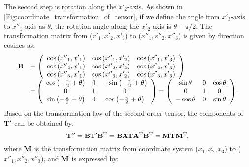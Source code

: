The second step is rotation along the $x'_2$-axis. As shown in \ref{Fig:coordinate_transformation_of_tensor}, if we define the angle from $x'_3$-axis to $x''_1$-axis as $\theta$, the rotation angle along the $x'_2$-axis is $\theta-{\pi}/{2}$. The transformation matrix from ($x'_1,x'_2,x'_3$) to ($x''_1,x''_2,x''_3$) is given by direction cosines as:
\begin{eqnarray}
\begin{array}{*{20}{l}}
{\bf{B}}&{ = \left( {\begin{array}{*{20}{c}}
{\cos \left( {{{x''}_1},{{x'}_1}} \right)}&{\cos \left( {{{x''}_1},{{x'}_2}} \right)}&{\cos \left( {{{x''}_1},{{x'}_3}} \right)}\\
{\cos \left( {{{x''}_2},{{x'}_1}} \right)}&{\cos \left( {{{x''}_2},{{x'}_2}} \right)}&{\cos \left( {{{x''}_2},{{x'}_3}} \right)}\\
{\cos \left( {{{x''}_3},{{x'}_1}} \right)}&{\cos \left( {{{x''}_3},{{x'}_2}} \right)}&{\cos \left( {{{x''}_3},{{x'}_3}} \right)}
\end{array}} \right)}\\
{}&{{\rm{ = }}\left( {\begin{array}{*{20}{c}}
{\cos \left( { - \frac{{{\mkern 1mu} \pi }}{2} + \theta } \right)}&0&{ - \sin \left( { - \frac{{{\mkern 1mu} \pi }}{2} + \theta } \right)}\\
0&1&0\\
{\sin \left( { - \frac{{{\mkern 1mu} \pi }}{2} + \theta } \right)}&0&{\cos \left( { - \frac{{{\mkern 1mu} \pi }}{2} + \theta } \right)}
\end{array}} \right) = \left( {\begin{array}{*{20}{c}}
{\sin \theta }&0&{\cos \theta }\\
0&1&0\\
{ - \cos \theta }&0&{\sin \theta }
\end{array}} \right)}.
\end{array}
\end{eqnarray}
Based on the transformation law of the second-order tensor, the components of ${\bf{T'}}$ can be obtained by:
\begin{equation}
{\bf{T''}} = {\bf{BT'}}{{\bf{B}}^{\rm{T}}} = {\bf{BAT}}{{\bf{A}}^{\rm{T}}}{{\bf{B}}^{\rm{T}}} = {\bf{MT}}{{\bf{M}}^{\rm{T}}},
\label{Equ:two_step_rotation}
\end{equation}
where ${\bf{M}}$ is the transformation matrix from coordinate system ($x_1,x_2,x_3$) to ($x''_1,x''_2,x''_3$), and ${\bf{M}}$ is expressed by:
